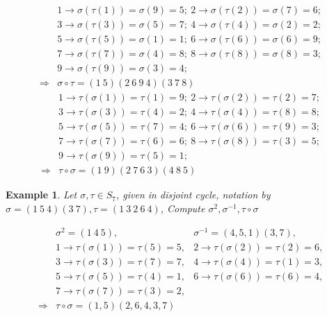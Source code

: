 \documentclass[11pt,a4paper]{article}
\newtheorem{example}{Example}
\begin{document}
\begin{equation}
    \begin{aligned}
        &1 \rightarrow \sigma(\tau(1))=\sigma(9)=5;\ 
        2 \rightarrow \sigma(\tau(2))=\sigma(7)=6;\\
        &3 \rightarrow \sigma(\tau(3))=\sigma(5)=7;\ 
        4 \rightarrow \sigma(\tau(4))=\sigma(2)=2;\\
        &5 \rightarrow \sigma(\tau(5))=\sigma(1)=1;\ 
        6 \rightarrow \sigma(\tau(6))=\sigma(6)=9;\\
        &7 \rightarrow \sigma(\tau(7))=\sigma(4)=8;\ 
        8 \rightarrow \sigma(\tau(8))=\sigma(8)=3;\\
        &9 \rightarrow \sigma(\tau(9))=\sigma(3)=4;\\
        \Rightarrow	&\sigma\circ\tau=(1\ 5)(2\ 6\ 9\ 4)(3\ 7\ 8)
    \end{aligned}
    \nonumber
\end{equation}
\begin{equation}
    \begin{aligned}
        &1 \rightarrow \tau(\sigma(1))=\tau(1)=9;\ 
        2 \rightarrow \tau(\sigma(2))=\tau(2)=7;\\
        &3 \rightarrow \tau(\sigma(3))=\tau(4)=2;\ 
        4 \rightarrow \tau(\sigma(4))=\tau(8)=8;\\
        &5 \rightarrow \tau(\sigma(5))=\tau(7)=4;\ 
        6 \rightarrow \tau(\sigma(6))=\tau(9)=3;\\
        &7 \rightarrow \tau(\sigma(7))=\tau(6)=6;\ 
        8 \rightarrow \tau(\sigma(8))=\tau(3)=5;\\
        &9 \rightarrow \tau(\sigma(9))=\tau(5)=1;\\
        \Rightarrow	&\tau\circ\sigma=(1\ 9)(2\ 7\ 6\ 3)(4\ 8\ 5)
    \end{aligned}
    \nonumber
\end{equation}
\begin{example}
    Let $\sigma,\tau \in S_7$, given in disjoint cycle,
    notation by
    $\sigma = (1\ 5\ 4)(3\ 7),
    \tau = (1\ 3\ 2\ 6\ 4)$,
    Compute
    $\sigma^2 ,
    \sigma^{-1} ,
    \tau\circ \sigma$
\end{example}
\begin{equation}
    \begin{aligned}
        &\sigma^2=(1\ 4\ 5),&\sigma^{-1}=(4,5,1)(3,7),\\
        &1 \rightarrow	\tau(\sigma(1))=\tau(5)=5,
        &2 \rightarrow	\tau(\sigma(2))=\tau(2)=6,\\
        &3 \rightarrow	\tau(\sigma(3))=\tau(7)=7,
        &4 \rightarrow	\tau(\sigma(4))=\tau(1)=3,\\
        &5 \rightarrow	\tau(\sigma(5))=\tau(4)=1,
        &6 \rightarrow	\tau(\sigma(6))=\tau(6)=4,\\
        &7 \rightarrow	\tau(\sigma(7))=\tau(3)=2,\\
        \Rightarrow	& \tau\circ \sigma=(1,5)(2,6,4,3,7)
    \end{aligned}
    \nonumber
\end{equation}
\end{document}
